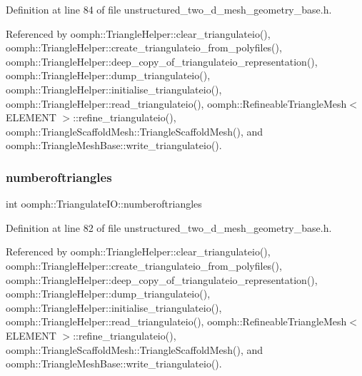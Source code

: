 Definition at line 84 of file unstructured\+\_\+two\+\_\+d\+\_\+mesh\+\_\+geometry\+\_\+base.\+h.



Referenced by oomph\+::\+Triangle\+Helper\+::clear\+\_\+triangulateio(), oomph\+::\+Triangle\+Helper\+::create\+\_\+triangulateio\+\_\+from\+\_\+polyfiles(), oomph\+::\+Triangle\+Helper\+::deep\+\_\+copy\+\_\+of\+\_\+triangulateio\+\_\+representation(), oomph\+::\+Triangle\+Helper\+::dump\+\_\+triangulateio(), oomph\+::\+Triangle\+Helper\+::initialise\+\_\+triangulateio(), oomph\+::\+Triangle\+Helper\+::read\+\_\+triangulateio(), oomph\+::\+Refineable\+Triangle\+Mesh$<$ E\+L\+E\+M\+E\+N\+T $>$\+::refine\+\_\+triangulateio(), oomph\+::\+Triangle\+Scaffold\+Mesh\+::\+Triangle\+Scaffold\+Mesh(), and oomph\+::\+Triangle\+Mesh\+Base\+::write\+\_\+triangulateio().

\mbox{\label{structoomph_1_1TriangulateIO_ab5df959c5a822eab8acedec2d806bae0}} 
\subsubsection{\texorpdfstring{numberoftriangles}{numberoftriangles}}
{\footnotesize\ttfamily int oomph\+::\+Triangulate\+I\+O\+::numberoftriangles}



Definition at line 82 of file unstructured\+\_\+two\+\_\+d\+\_\+mesh\+\_\+geometry\+\_\+base.\+h.



Referenced by oomph\+::\+Triangle\+Helper\+::clear\+\_\+triangulateio(), oomph\+::\+Triangle\+Helper\+::create\+\_\+triangulateio\+\_\+from\+\_\+polyfiles(), oomph\+::\+Triangle\+Helper\+::deep\+\_\+copy\+\_\+of\+\_\+triangulateio\+\_\+representation(), oomph\+::\+Triangle\+Helper\+::dump\+\_\+triangulateio(), oomph\+::\+Triangle\+Helper\+::initialise\+\_\+triangulateio(), oomph\+::\+Triangle\+Helper\+::read\+\_\+triangulateio(), oomph\+::\+Refineable\+Triangle\+Mesh$<$ E\+L\+E\+M\+E\+N\+T $>$\+::refine\+\_\+triangulateio(), oomph\+::\+Triangle\+Scaffold\+Mesh\+::\+Triangle\+Scaffold\+Mesh(), and oomph\+::\+Triangle\+Mesh\+Base\+::write\+\_\+triangulateio().

\mbox{\label{structoomph_1_1TriangulateIO_abfbccde367584c0b55a0513bf9e8b929}} 
